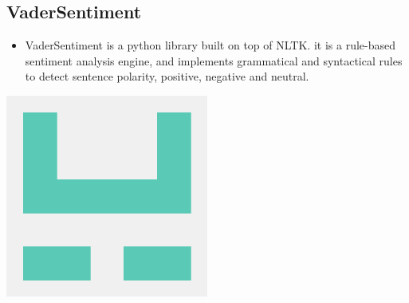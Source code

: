 \subsection{VaderSentiment}
\begin{minipage}{0.4\textwidth}
\begin{itemize}
\item[\textbf{\emph{}}] 
VaderSentiment is a python library built on top of NLTK. it is a rule-based sentiment analysis engine, and implements grammatical and syntactical rules to detect sentence polarity, positive, negative and neutral.
\end{itemize}
\end{minipage}%
%
\begin{minipage}{0.4\textwidth}
\begin{center}
    \includegraphics[width=0.5\textwidth]{images/VaderSentiment_logo}
    \label{img:g}
\end{center}
\end{minipage}



